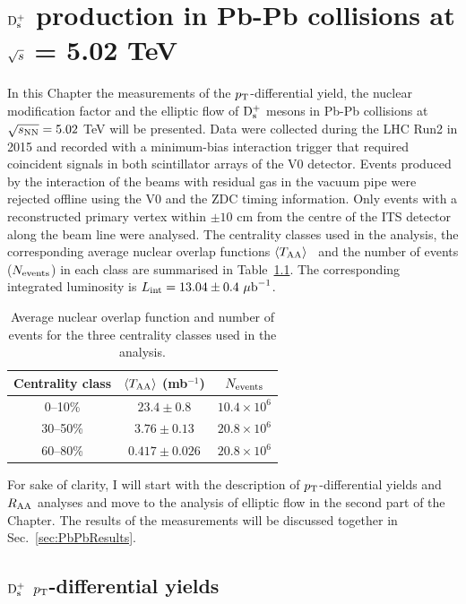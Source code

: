 \chapter{${\rm D_s^+}$ production in Pb-Pb collisions at $\sqrt{s}$ = 5.02 TeV}
\label{chap:PbPb}
In this Chapter the measurements of the $p_{\rm T}$-differential yield,
the nuclear modification factor and the elliptic flow of ${\rm D_s^+}$ mesons
in Pb-Pb collisions at $\sqrt{s_{\rm NN}} = 5.02$ TeV will be presented. Data were
collected during the LHC Run2 in 2015 and recorded with a 
minimum-bias interaction trigger that required coincident signals in 
both scintillator arrays of the V0 detector. Events produced by 
the interaction of the beams with residual gas in the
vacuum pipe were rejected offline using the V0 and the ZDC 
timing information. Only events with a reconstructed primary vertex 
within $\pm 10$ cm from the centre of the ITS detector along
the beam line were analysed. The centrality classes 
used in the analysis, the corresponding 
average nuclear overlap functions $\left\langle T_{\rm AA} \right\rangle$~\cite{ALICE-PUBLIC-2015-008} 
and the number of events ($N_{\rm events}$) in each class 
are summarised in Table~\ref{tab:Nevents}. The corresponding 
integrated luminosity is $L_{\rm int}=13.04\pm0.4~\mathrm{\mu b}^{-1}$.\\
\begin{table}[!h]
	\centering
	\begin{tabular}{ccc}
	\hline
	Centrality class & $\langle T_{\rm AA}\rangle$ (mb$^{-1}$)& $N_{\rm events}$\\
	\hline
	\phantom{0}0--10\% & $23.4\pm0.8$ & $10.4 \times 10^6$ \\
	30--50\% & $3.76\pm0.13$ & $20.8 \times 10^6$\\
	60--80\% & $0.417 \pm 0.026$ & $20.8 \times 10^6$\\
	\hline
	\end{tabular}		
	\caption{Average nuclear overlap function and number of events  for the three centrality classes used in the analysis.}
	\label{tab:Nevents}
\end{table}

For sake of clarity, I will start with the description of $p_{\rm T}$-differential yields and $R_{\rm AA}$ 
analyses and move to the analysis of elliptic flow in the second part of the Chapter. 
The results of the measurements will be discussed together in Sec.~\ref{sec:PbPbResults}.

\section{${\rm D_s^+}$ $p_{\rm T}$-differential yields}
\label{sec:YieldsAndRaa}
